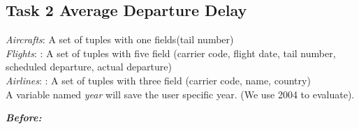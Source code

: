 \documentclass[12pt]{article}
\begin{document}
\subsection*{Task 2 Average Departure Delay}

\textit{Aircrafts}: A set of tuples with one fields(tail number)\\
\textit{Flights}: : A set of tuples with five field (carrier code, flight date, tail number, scheduled departure, actual departure)\\
\textit{Airlines}: : A set of tuples with three field (carrier code, name, country)\\
A variable named \textit{year} will save the user specific year. (We use 2004 to evaluate). 

\textbf{\textit{Before:}} 
\end{document}
